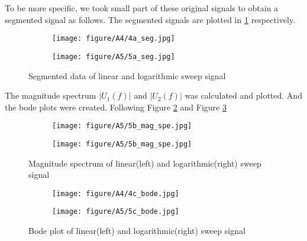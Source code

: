 \documentclass[
	a4paper,
	11pt,
]{article}
\begin{document}
To be more specific, we took small part of these original signals to obtain a segmented signal as follows. The segmented signals are plotted in \ref{fig:a45_seg_fig} respectively.
\begin{figure}[h]
    \centering
    \begin{subfigure}[b]{0.47\textwidth}
        \centering
        \texttt{[image: figure/A4/4a\_seg.jpg]}
    \end{subfigure}
    \hfill
    \begin{subfigure}[b]{0.47\textwidth}
        \centering
        \texttt{[image: figure/A5/5a\_seg.jpg]} 
    \end{subfigure}
    \caption{Segmented data of linear and logarithmic sweep signal}
    \label{fig:a45_seg_fig}
\end{figure}


The magnitude spectrum \(\left| U_1(f) \right|\) and \(\left| U_2(f) \right|\) was calculated and plotted. And the bode plots were created. Following Figure \ref{fig:a45_mag_spectrum} and Figure \ref{fig:a45_last_fig}\\

\begin{figure}
    \centering
    \begin{subfigure}[b]{0.47\textwidth}
        \centering
        \texttt{[image: figure/A5/5b\_mag\_spe.jpg]}
    \end{subfigure}
    \hfill
    \begin{subfigure}[b]{0.47\textwidth}
        \centering
        \texttt{[image: figure/A5/5b\_mag\_spe.jpg]}
    \end{subfigure}
    \caption{Magnitude spectrum of linear(left) and logarithmic(right) sweep signal}
    \label{fig:a45_mag_spectrum}
\end{figure}
\begin{figure}
    \centering
    \begin{subfigure}[b]{0.47\textwidth}
        \centering
        \texttt{[image: figure/A4/4c\_bode.jpg]}
    \end{subfigure}
    \hfill
    \begin{subfigure}[b]{0.47\textwidth}
        \centering
        \texttt{[image: figure/A5/5c\_bode.jpg]}
    \end{subfigure}
    \caption{Bode plot of linear(left) and logarithmic(right) sweep signal}
    \label{fig:a45_last_fig}
\end{figure}
\end{document}
